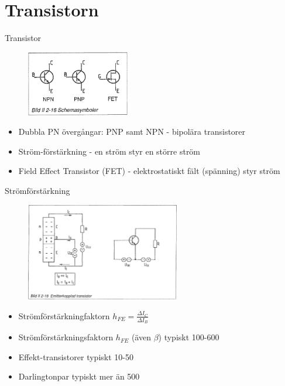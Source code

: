 \documentclass{beamer}
\begin{document}
\section{Transistorn}

\begin{frame}{Transistor}

\begin{figure}[h]
\includegraphics[width=0.4\textwidth]{images/bild_2_2-16}
\end{figure}

\begin{itemize}
  \item Dubbla PN övergångar: PNP samt NPN - bipolära transistorer
  \item Ström-förstärkning - en ström styr en större ström
  \item Field Effect Transistor (FET) - elektrostatiskt fält (spänning) styr ström
\end{itemize}
\end{frame}

\begin{frame}{Strömförstärkning}

\begin{figure}[h]
\includegraphics[width=0.6\textwidth]{images/bild_2_2-18}
\end{figure}

\begin{itemize}
    \item Strömförstärkningfaktorn $h_{FE}=\frac{\Delta I_C}{\Delta I_B}$
    \item Strömförstärkningsfaktorn $h_{FE}$ (även $\beta$) typiskt 100-600
    \item Effekt-transistorer typiskt 10-50
    \item Darlingtonpar typiskt mer än 500
  \end{itemize}
\end{frame}
\end{document}
